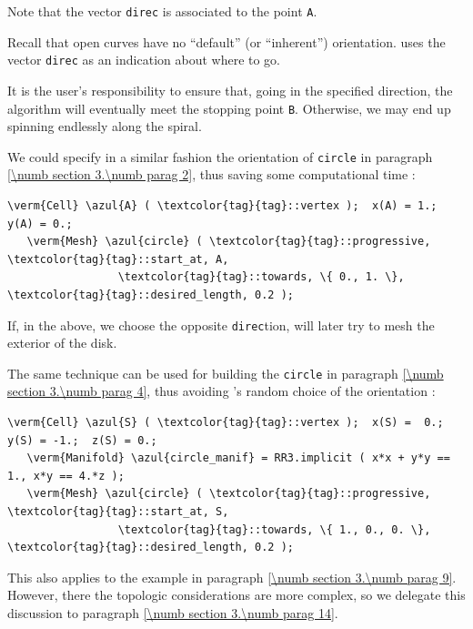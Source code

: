 Note that the vector {\small\tt direc} is associated to the point {\small\tt A}.

Recall that open curves have no ``default'' (or ``inherent'') orientation.
{\ManiFEM} uses the vector {\small\tt direc} as an indication about where to go.

It is the user's responsibility to ensure that, going in the specified direction,
the algorithm will eventually meet the stopping point {\small\tt B}.
Otherwise, we may end up spinning endlessly along the spiral.

We could specify in a similar fashion the orientation of {\small\tt circle} in paragraph
\ref{\numb section 3.\numb parag 2}, thus saving some computational time :

\begin{Verbatim}[commandchars=\\\{\},formatcom=\small\tt,
   baselinestretch=0.94,framesep=2mm                                            ]
   \verm{Cell} \azul{A} ( \textcolor{tag}{tag}::vertex );  x(A) = 1.;  y(A) = 0.;
   \verm{Mesh} \azul{circle} ( \textcolor{tag}{tag}::progressive, \textcolor{tag}{tag}::start_at, A,
                 \textcolor{tag}{tag}::towards, \{ 0., 1. \}, \textcolor{tag}{tag}::desired_length, 0.2 );
\end{Verbatim}

If, in the above, we choose the opposite {\small\tt direc}tion,
{\maniFEM} will later try to mesh the exterior of the disk.

The same technique can be used for building the {\small\tt circle} in paragraph
\ref{\numb section 3.\numb parag 4}, thus avoiding \maniFEM's random choice of the orientation :

\begin{Verbatim}[commandchars=\\\{\},formatcom=\small\tt,
   baselinestretch=0.94,framesep=2mm                     ]
   \verm{Cell} \azul{S} ( \textcolor{tag}{tag}::vertex );  x(S) =  0.;   y(S) = -1.;  z(S) = 0.;
   \verm{Manifold} \azul{circle_manif} = RR3.implicit ( x*x + y*y == 1., x*y == 4.*z );
   \verm{Mesh} \azul{circle} ( \textcolor{tag}{tag}::progressive, \textcolor{tag}{tag}::start_at, S,
                 \textcolor{tag}{tag}::towards, \{ 1., 0., 0. \}, \textcolor{tag}{tag}::desired_length, 0.2 );
\end{Verbatim}

This also applies to the example in paragraph \ref{\numb section 3.\numb parag 9}.
However, there the topologic considerations are more complex, so we delegate this
discussion to paragraph \ref{\numb section 3.\numb parag 14}.


